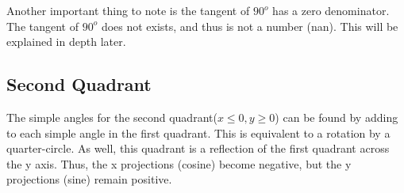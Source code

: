Another important thing to note is the tangent of $90^o$ has a zero denominator.  The tangent of $90^o$ does not exists, and thus is not a number (nan).  This will be explained in depth later.

\clearpage
\subsection{Second Quadrant}

The simple angles for the second quadrant($x \leq 0 , y \geq 0$) can be found by adding \pitwo to each simple angle in the first quadrant.  This is equivalent to a rotation by a quarter-circle.  As well, this quadrant is a reflection of the first quadrant across the y axis.  Thus, the x projections (cosine) become negative, but the y projections (sine) remain positive.\\

